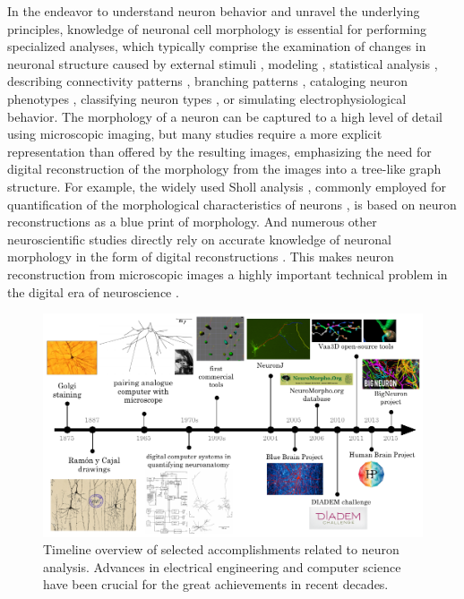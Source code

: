 In the endeavor to understand neuron behavior and unravel the underlying principles, knowledge of neuronal cell morphology is essential for performing specialized analyses, which typically comprise the examination of changes in neuronal structure caused by external stimuli \cite{gomez2007immobilized, koppes2011neurite}, modeling \cite{ascoli2001computer}, statistical analysis \cite{samsonovich2005statistical, polavaram2014statistical}, describing connectivity patterns \cite{jiang2015principles}, branching patterns \cite{vallotton2007automated}, cataloging neuron phenotypes \cite{defelipe2013new}, classifying neuron types \cite{armananzas2015towards}, or simulating electrophysiological behavior. The morphology of a neuron can be captured to a high level of detail using microscopic imaging, but many studies require a more explicit representation than offered  by the resulting images, emphasizing the need for digital reconstruction of the morphology from the images into a tree-like graph structure. For example, the widely used Sholl analysis \cite{sholl1953dendritic}, commonly employed for quantification of the morphological characteristics of neurons \cite{garcia2014new}, is based on neuron reconstructions as a blue print of morphology. And numerous other neuroscientific studies directly rely on accurate knowledge of neuronal morphology in the form of digital reconstructions \cite{halavi2012digital, parekh2013neuronal}. This makes neuron reconstruction from microscopic images a highly important technical problem in the digital era of neuroscience \cite{peng2015diadem}.

\begin{figure}
	\begin{center}
		\includegraphics[width=\textwidth]{fig1}
	\end{center}
	\caption{Timeline overview of selected accomplishments related to neuron analysis. Advances in electrical engineering and computer science have been crucial for the great achievements in recent decades.}
	\label{ch1:fig1}
\end{figure}

